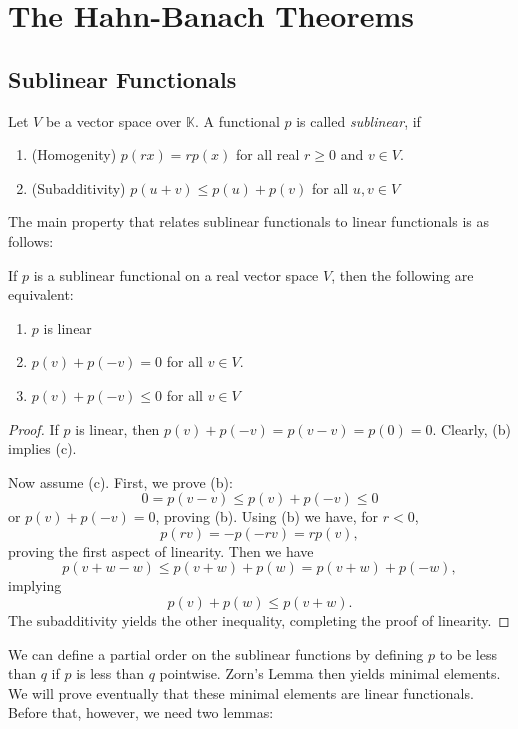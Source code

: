 \documentclass[twoside,symmetric, openany, 12pt]{./tuftebook}
\theoremstyle{definition}
\theoremstyle{definition}
\theoremstyle{definition}
\newenvironment{parts}{\begin{enumerate}[label=(\alph*)]}{\end{enumerate}}
\begin{document}
	\section{The Hahn-Banach Theorems}
	\subsection{Sublinear Functionals}
	\begin{Definition}
		Let $V$ be a vector space over $\mathbb{K}$. A functional $p$ is called \emph{sublinear}, if
		\begin{parts}
			\item (Homogenity) $p(rx)=rp(x)$ for all real $r\ge 0$ and $v\in V$.
			\item (Subadditivity) $p(u+v)\le p(u)+p(v)$ for all $u,v\in V$
		\end{parts}
	\end{Definition}
The main property that relates sublinear functionals to linear functionals is as follows:
\begin{Theorem}
	If $p$ is a sublinear functional on a real vector space $V$, then the following are equivalent:
	\begin{parts}
	\item $p$ is linear
	\item $p(v)+p(-v)=0$ for all $v\in V$.
	\item $p(v)+p(-v)\le 0$ for all $v\in V$
	\end{parts}
\end{Theorem}
\begin{proof}
	If $p$ is linear, then $p(v)+p(-v)=p(v-v)=p(0)=0$. Clearly, (b) implies (c).

	Now assume (c). First, we prove (b):
	\[
	0=p(v-v)\le p(v)+p(-v) \le 0
	\]
	or $p(v)+p(-v)=0$, proving (b). Using (b) we have, for $r<0$,
	\[
	p(rv)=-p(-rv)=rp(v)
	,\]
	proving the first aspect of linearity. Then we have
	\[
	p(v+w-w)\le p(v+w)+p(w)=p(v+w)+p(-w)
	,\]
	implying
	\[
	p(v)+p(w)\le p(v+w)
	.\] 
	The subadditivity yields the other inequality, completing the proof of linearity.
\end{proof}

We can define a partial order on the sublinear functions by defining $p$ to be less than $q$ if $p$ is less than $q$ pointwise. Zorn's Lemma then yields minimal elements. We will prove eventually that these minimal elements are linear functionals. Before that, however, we need two lemmas:
\end{document}
